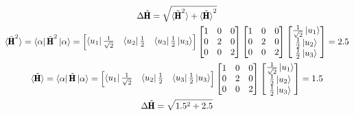 \documentclass[12pt]{article}
\newcommand{\OP}[1]{\tilde{\pmb{\text{#1}}}}
\begin{document}
\begin{enumerate}
\begin{enumerate}
            \begin{gather*}
                \Delta\OP{H}=\sqrt{\braket{\OP{H}^2}+\braket{\OP{H}}^2}\\
                \braket{\OP{H}^2}=\bra{\alpha}\OP{H}^2\ket{\alpha}=
                \begin{bmatrix}
                    \bra{u_1}\frac{1}{\sqrt{2}} & \bra{u_2}\frac{1}{2}        & \bra{u_3}\frac{1}{2}\ket{u_3}
                \end{bmatrix}
                \begin{bmatrix}
                    1 & 0 & 0 \\
                    0 & 2 & 0 \\
                    0 & 0 & 2
                \end{bmatrix}
                \begin{bmatrix}
                    1 & 0 & 0 \\
                    0 & 2 & 0 \\
                    0 & 0 & 2
                \end{bmatrix}
                \begin{bmatrix}
                    \frac{1}{\sqrt{2}}\ket{u_1} \\
                    \frac{1}{2}\ket{u_2}        \\
                    \frac{1}{2}\ket{u_3}
                \end{bmatrix}=2.5\\
                \braket{\OP{H}}=\bra{\alpha}\OP{H}\ket{\alpha}=
                \begin{bmatrix}
                    \bra{u_1}\frac{1}{\sqrt{2}} & \bra{u_2}\frac{1}{2}        & \bra{u_3}\frac{1}{2}\ket{u_3}
                \end{bmatrix}
                \begin{bmatrix}
                    1 & 0 & 0 \\
                    0 & 2 & 0 \\
                    0 & 0 & 2
                \end{bmatrix}
                \begin{bmatrix}
                    \frac{1}{\sqrt{2}}\ket{u_1} \\
                    \frac{1}{2}\ket{u_2}        \\
                    \frac{1}{2}\ket{u_3}
                \end{bmatrix}=1.5\\
                \Delta\OP{H}=\sqrt{1.5^2+2.5}

\end{gather*}
\end{enumerate}
\end{enumerate}
\end{document}

